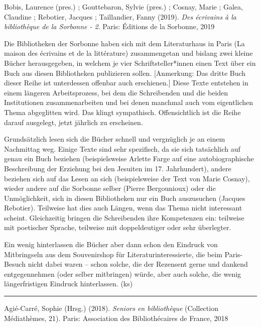 \documentclass[a4paper,
fontsize=11pt,
oneside,
numbers=noperiodatend,
parskip=half-,
bibliography=totoc,
final
]{scrartcl}
\begin{document}
Bobis, Laurence (pres.) ; Gouttebaron, Sylvie (pres.) ; Cosnay, Marie ;
Galea, Claudine ; Rebotier, Jacques ; Taillandier, Fanny (2019).
\emph{Des écrivains à la bibliothèque de la Sorbonne - 2}. Paris:
Éditions de la Sorbonne, 2019

Die Bibliotheken der Sorbonne haben sich mit dem Literaturhaus in Paris
(La maison des écrivains et de la littérature) zusammengetan und bislang
zwei kleine Bücher herausgegeben, in welchem je vier
Schriftsteller*innen einen Text über ein Buch aus diesen Bibliotheken
publizieren sollen. {[}Anmerkung: Das dritte Buch dieser Reihe ist
unterdessen offenbar auch erschienen.{]} Diese Texte entstehen in einem
längeren Arbeitsprozess, bei dem die Schreibenden und die beiden
Institutionen zusammenarbeiten und bei denen manchmal auch vom
eigentlichen Thema abgeglitten wird. Das klingt sympathisch.
Offensichtlich ist die Reihe darauf ausgelegt, jetzt jährlich zu
erscheinen.

Grundsätzlich lesen sich die Bücher schnell und vergnüglich je an einem
Nachmittag weg. Einige Texte sind sehr spezifisch, da sie sich
tatsächlich auf genau ein Buch beziehen (beispielsweise Arlette Farge
auf eine autobiographische Beschreibung der Erziehung bei den Jesuiten
im 17. Jahrhundert), andere beziehen sich auf das Lesen an sich
(beispielsweise der Text von Marie Cosnay), wieder andere auf die
Sorbonne selber (Pierre Bergounioux) oder die Unmöglichkeit, sich in
diesen Bibliotheken nur ein Buch auszusuchen (Jacques Rebotier).
Teilweise hat dies auch Längen, wenn das Thema nicht interessant
scheint. Gleichzeitig bringen die Schreibenden ihre Kompetenzen ein:
teilweise mit poetischer Sprache, teilweise mit doppeldeutiger oder sehr
überlegter.

Ein wenig hinterlassen die Bücher aber dann schon den Eindruck von
Mitbringseln aus dem Souvenirshop für Literaturinteressierte, die beim
Paris-Besuch nicht dabei waren -- schon solche, die der Rezensent gerne
und dankend entgegennehmen (oder selber mitbringen) würde, aber auch
solche, die wenig längerfristigen Eindruck hinterlassen. (ks)

\begin{center}\rule{0.5\linewidth}{0.5pt}\end{center}

Agié-Carré, Sophie (Hrsg.) (2018). \emph{Seniors en bibliothèque}
(Collection Médiathèmes, 21). Paris: Association des Bibliothécaires de
France, 2018
\end{document}

